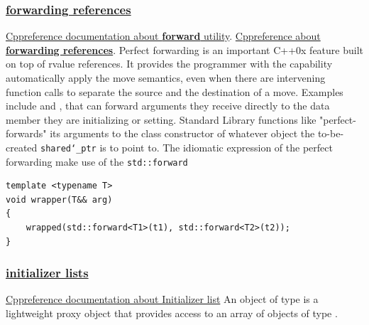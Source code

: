 \subsubsection{\href{https://github.com/AnthonyCalandra/modern-cpp-features/tree/master\#forwarding-references}
                    {forwarding references}}
\href{https://en.cppreference.com/w/cpp/utility/forward}{Cppreference documentation about \textbf{forward} utility}. 
\newline
\href{https://en.cppreference.com/w/cpp/language/reference#Forwarding_references}{Cppreference about \textbf{forwarding references}}.
\newline
Perfect forwarding is an important C++0x feature built on top of rvalue 
references. It provides the programmer with the capability automatically 
apply the move semantics, even when there are intervening function calls 
to separate the source and the destination of a move.
\newline
Examples include  and , 
that can forward arguments they receive directly to the data member they 
are initializing or setting. Standard Library functions like 
 "perfect-forwards" its arguments to the class 
constructor of whatever object the to-be-created \texttt{shared\char`_ptr} 
is to point to.
\newline
The idiomatic expression of the perfect forwarding make use of the 
\texttt{std::forward} 
\begin{lstlisting}[language=C+++]
template <typename T>
void wrapper(T&& arg) 
{
    wrapped(std::forward<T1>(t1), std::forward<T2>(t2));
}
\end{lstlisting}

\subsubsection{\href{https://github.com/AnthonyCalandra/modern-cpp-features/tree/master\#initializer-lists}
                    {initializer lists}}
\href{https://en.cppreference.com/w/cpp/utility/initializer_list}{Cppreference documentation about Initializer list}
\newline
An object of type  is a 
lightweight proxy object that provides access to an array of objects of 
type . 

